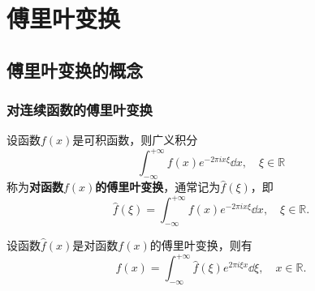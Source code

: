 \chapter{傅里叶变换}
\section{傅里叶变换的概念}
\subsection{对连续函数的傅里叶变换}
\begin{definition}
设函数\(f(x)\)是可积函数，则广义积分\[
\int_{-\infty}^{+\infty} f(x) e^{-2 \pi i x \xi} \dd{x}, \quad \xi \in \mathbb{R}
\]称为\textbf{对函数\(f(x)\)的傅里叶变换}，通常记为\(\hat{f}(\xi)\)，即\[
\hat{f}(\xi) = \int_{-\infty}^{+\infty} f(x) e^{-2 \pi i x \xi} \dd{x}, \quad \xi \in \mathbb{R}.
\]
\end{definition}

\begin{theorem}
设函数\(\hat{f}(x)\)是对函数\(f(x)\)的傅里叶变换，则有\[
f(x) = \int_{-\infty}^{+\infty} \hat{f}(\xi) e^{2 \pi i \xi x} \dd{\xi}, \quad x \in \mathbb{R}.
\]
\end{theorem}
